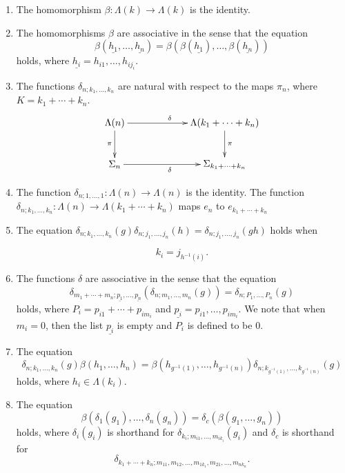\begin{thm}
\begin{enumerate}
\item\label{eq2} The homomorphism $\beta \colon \Lambda(k) \rightarrow \Lambda(k)$ is the identity.
\item\label{eq3} The homomorphisms $\beta$ are associative in the sense that the equation
\[
  \beta(\underline{h_1},\ldots,\underline{h_n}) = \beta(\beta(\underline{h_1}),\ldots,\beta(\underline{h_n}))
\]
holds, where $\underline{h_i} = h_{i1},\ldots,h_{ij_i}$.
\item\label{eq4} The functions $\delta_{n; k_{1}, \ldots, k_{n}}$ are natural with respect to the maps $\pi_{n}$, where $K = k_1 + \cdots + k_n$.
  \[
    \xy
      (0,0)*+{\Lambda(n)} ="00";
      (40,0)*+{\Lambda(k_{1} + \cdots + k_{n}) } ="20";
      (0,-15)*+{\Sigma_{n}  } ="01";
      (40,-15)*+{\Sigma_{k_{1} + \cdots + k_{n}} } ="21";
      {\ar^{\delta} "00" ; "20"};
      {\ar^{\pi} "20" ; "21"};
      {\ar_{\pi} "00" ; "01"};
      {\ar_{\delta} "01" ; "21"};
    \endxy
  \]


\item\label{eq5} The function $\delta_{n; 1, \ldots, 1} \colon \Lambda(n) \rightarrow \Lambda(n)$ is the identity. The function $\delta_{n;k_1,\ldots,k_n} \colon \Lambda(n) \to \Lambda(k_1 + \cdots + k_n)$ maps $e_n$ to $e_{k_1 + \cdots + k_n}$
\item\label{eq6} The equation $\delta_{n; k_1, \ldots, k_n}(g) \delta_{n; j_1, \ldots, j_n}(h) = \delta_{n; j_1,\ldots,j_n}(gh)$ holds when

  \[
    k_{i} = j_{h^{-1}(i)}.
  \]
\item\label{eq7} The functions $\delta$ are associative in the sense that the equation
  \[
    \delta_{m_1 + \cdots + m_n; \underline{p_1},\ldots,\underline{p_n}}\left( \delta_{n; m_{1}, \ldots, m_{n}}(g) \right) = \delta_{n; P_{1}, \ldots, P_{n}}(g)
  \]
holds, where $P_{i} = p_{i1} + \cdots + p_{im_{i}}$ and $\underline{p_i} = p_{i1}, \ldots, p_{im_i}$. We note that when $m_i = 0$, then the list $\underline{p_i}$ is empty and $P_i$ is defined to be $0$.
\item\label{eq8} The equation
  \[
    \delta_{n;k_1,\ldots,k_n}(g) \beta(h_{1}, \ldots, h_{n}) = \beta(h_{g^{-1}(1)}, \ldots,  h_{g^{-1}(n)}) \delta_{n;k_{g^{-1}(1)},\ldots,k_{g^{-1}(n)}}(g)
  \]
holds, where $h_{i} \in \Lambda(k_{i})$.
\item\label{eq9} The equation
  \[
    \beta(\delta_{1}(g_{1}), \ldots, \delta_{n}(g_{n})) = \delta_{c}(\beta(g_{1}, \ldots, g_{n}))
  \]
holds, where $\delta_{i}(g_{i})$ is shorthand for $\delta_{k_{i}; m_{i1}, \ldots, m_{ik_{i}}}(g_{i})$ and $\delta_{c}$ is shorthand for
  \[
    \delta_{k_{1}+\cdots + k_{n}; m_{11}, m_{12}, \ldots, m_{1k_{1}}, m_{21}, \ldots, m_{nk_{n}}}.
  \]
\end{enumerate}
\end{thm}

